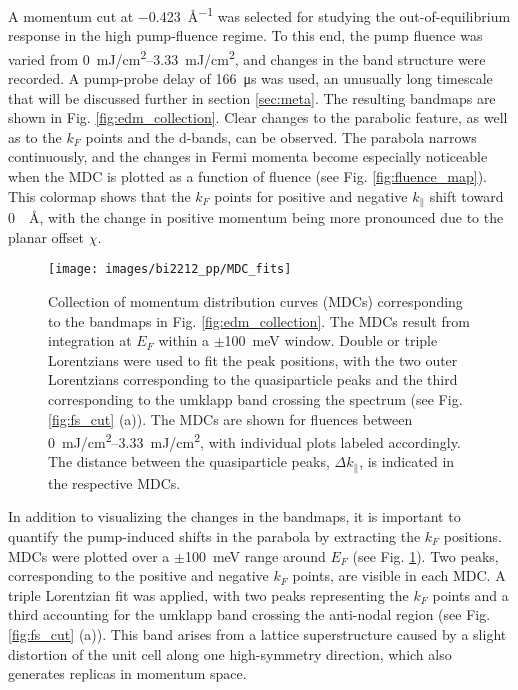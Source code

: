 A momentum cut at \qty{-0.423}{\angstrom^{-1}} was selected for studying the out-of-equilibrium response in the high pump-fluence regime.
To this end, the pump fluence was varied from \qtyrange{0}{3.33}{\milli\joule/\centi\meter\squared}, and changes in the band structure were recorded.
A pump-probe delay of \qty{166}{\micro\second} was used, an unusually long timescale that will be discussed further in section \ref{sec:meta}.
The resulting bandmaps are shown in Fig. \ref{fig:edm_collection}.
Clear changes to the parabolic feature, as well as to the $k_F$ points and the  d-bands, can be observed.
The parabola narrows continuously, and the changes in Fermi momenta become especially noticeable when the MDC is plotted as a function of fluence (see Fig. \ref{fig:fluence_map}).
This colormap shows that the $k_F$ points for positive and negative $k_\parallel$ shift toward \qty{0}{\per\angstrom}, with the change in positive momentum being more pronounced due to the planar offset $\chi$.

\begin{figure}[t]
	\centering
	\texttt{[image: images/bi2212\_pp/MDC\_fits]}
	\caption{Collection of momentum distribution curves (MDCs) corresponding to the bandmaps in Fig. \ref{fig:edm_collection}. The MDCs result from integration at $E_F$ within a $\pm$\qty{100}{\milli\electronvolt} window. Double or triple Lorentzians were used to fit the peak positions, with the two outer Lorentzians corresponding to the quasiparticle peaks and the third corresponding to the umklapp band crossing the spectrum (see Fig. \ref{fig:fs_cut} (a)). The MDCs are shown for fluences between \qtyrange{0}{3.33}{\milli\joule/\centi\meter\squared}, with individual plots labeled accordingly. The distance between the quasiparticle peaks, $\Delta k_\parallel$, is indicated in the respective MDCs.}
	\label{fig:mdc_fits}
\end{figure}

In addition to visualizing the changes in the bandmaps, it is important to quantify the pump-induced shifts in the parabola by extracting the $k_F$ positions.
MDCs were plotted over a $\pm$\qty{100}{\milli\electronvolt} range around $E_F$ (see Fig. \ref{fig:mdc_fits}).
Two peaks, corresponding to the positive and negative $k_F$ points, are visible in each MDC.
A triple Lorentzian fit was applied, with two peaks representing the $k_F$ points and a third accounting for the umklapp band crossing the anti-nodal region (see Fig. \ref{fig:fs_cut} (a)).
This band arises from a lattice superstructure caused by a slight distortion of the unit cell along one high-symmetry direction, which also generates replicas in momentum space.

